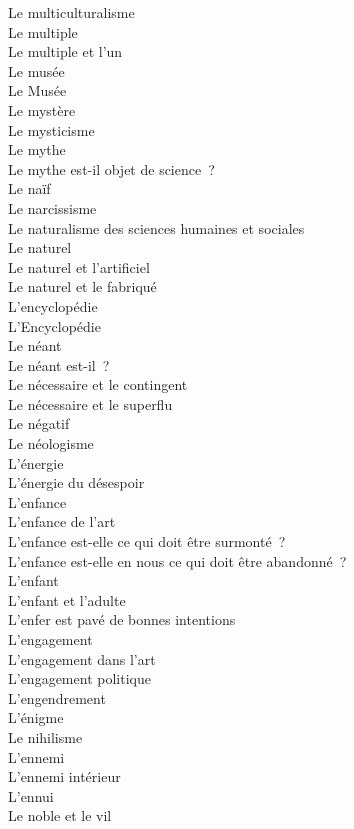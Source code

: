 \documentclass[a4paper,12pt]{article}
\begin{document}
Le multiculturalisme \\
Le multiple \\
Le multiple et l'un \\
Le musée \\
Le Musée \\
Le mystère \\
Le mysticisme \\
Le mythe \\
Le mythe est-il objet de science ? \\
Le naïf \\
Le narcissisme \\
Le naturalisme des sciences humaines et sociales \\
Le naturel \\
Le naturel et l'artificiel \\
Le naturel et le fabriqué \\
L'encyclopédie \\
L'Encyclopédie \\
Le néant \\
Le néant est-il ? \\
Le nécessaire et le contingent \\
Le nécessaire et le superflu \\
Le négatif \\
Le néologisme \\
L'énergie \\
L'énergie du désespoir \\
L'enfance \\
L'enfance de l'art \\
L'enfance est-elle ce qui doit être surmonté ? \\
L'enfance est-elle en nous ce qui doit être abandonné ? \\
L'enfant \\
L'enfant et l'adulte \\
L'enfer est pavé de bonnes intentions \\
L'engagement \\
L'engagement dans l'art \\
L'engagement politique \\
L'engendrement \\
L'énigme \\
Le nihilisme \\
L'ennemi \\
L'ennemi intérieur \\
L'ennui \\
Le noble et le vil \\
\end{document}
